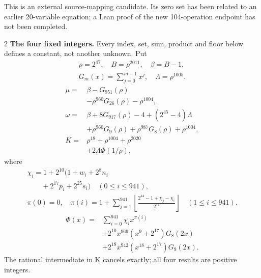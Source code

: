 \documentclass[10pt]{article}
\newcommand{\fl}[1]{\left\lfloor#1\right\rfloor}
\begin{document}
This is an external source-mapping candidate. Its zero set has been related to
an earlier 20-variable equation; a Lean proof of the new 104-operation endpoint
has not been completed.
\bigskip
\begin{multicols}{2}\fontsize{7.7}{8.2}\selectfont
\textbf{The four fixed integers.}
Every index, set, sum, product and floor below defines a constant, not
another unknown. Put
\[
\begin{gathered}
\rho=2^{47},\quad B=\rho^{2011},\quad\beta=B-1,\\
G_m(x)=\sum_{j=0}^{m-1}x^j,\quad
\Lambda=\rho^{1005}.
\end{gathered}
\]
\begin{align*}
\mu={}&\beta-G_{951}(\rho)\\
&-\rho^{960}G_{26}(\rho)-\rho^{1004},\\
\omega={}&\beta+8G_{917}(\rho)-4+(2^{45}-4)\Lambda\\
&+\rho^{960}G_9(\rho)+\rho^{987}G_8(\rho)
  +\rho^{1004},\\
K={}&\rho^{18}+\rho^{1004}+\rho^{2020}\\
&+2\Lambda\Phi(1/\rho),
\end{align*}
where
\[
\begin{gathered}
\chi_i=1+2^{10}(1+w_i+2^8n_i\\
\qquad+2^{17}p_i+2^{25}s_i)\quad(0\le i\le941),\\
\pi(0)=0,\quad\pi(i)=1+\sum_{j=1}^{941}
\fl{\frac{2^{44}-1+\chi_j-\chi_i}{2^{44}}}\quad(1\le i\le941).
\end{gathered}
\]
\[
\begin{split}
\Phi(x)={}&\sum_{i=0}^{941}\chi_i x^{\pi(i)}\\
&+2^{10}x^{969}(x^9+2^{17})G_8(2x)\\
&+2^{18}x^{942}(x^{18}+2^{17})G_9(2x).
\end{split}
\]
The rational intermediate in K cancels exactly; all four results are positive integers.


\end{multicols}
\end{document}
